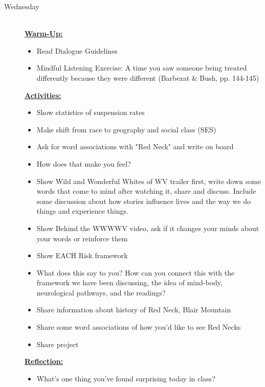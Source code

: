 \documentclass{article}
\newcommand{\tabbreak}{\begin{center}\faAsterisk\faAsterisk\faAsterisk\\\end{center}}
\newcommand{\listwed}{\item[\large\textsf{Wednesday}\normalsize] \hfill \\}
\newenvironment{daywu}
	{\underline{\textbf{Warm-Up:}} \hfill \\
	\begin{itemize}}
	{\end{itemize}}
\newenvironment{dayact}
	{\underline{\textbf{Activities:}} \hfill \\
	\begin{itemize}}
	{\end{itemize}}
\newenvironment{dayref}
	{\underline{\textbf{Reflection:}} \hfill \\
	\begin{itemize}}
	{\end{itemize}}
\newenvironment{weeksched}
	{\noindent
	\begin{description}}
	{\end{description}
	\newpage}
\begin{document}
\begin{weeksched}
\listwed
\begin{daywu}
	\item Read Dialogue Guidelines
	\item Mindful Listening Exercise: A time you saw someone being treated differently because they were different (Barbezat \& Bush, pp. 144-145)
\end{daywu}
\begin{dayact}
	\item Show statistics of suspension rates
	\item Make shift from race to geography and social class (SES)
	\item Ask for word associations with "Red Neck" and write on board
	\item How does that make you feel?
	\item Show Wild and Wonderful Whites of WV trailer first, write down some words that come to mind after watching it, share and discuss. Include some discussion about how stories influence lives and the way we do things and experience things.
	\item Show Behind the WWWWV video, ask if it changes your minds about your words or reinforce them
	\item Show EACH Risk framework
	\item What does this say to you? How can you connect this with the framework we have been discussing, the idea of mind-body, neurological pathways, and the readings?
	\item Share information about history of Red Neck, Blair Mountain
	\item Share some word associations of how you'd like to see Red Necks
	\item Share project
\end{dayact}
\begin{dayref}
	\item What's one thing you've found surprising today in class?
\end{dayref}
\end{weeksched}

\tabbreak
\end{document}
